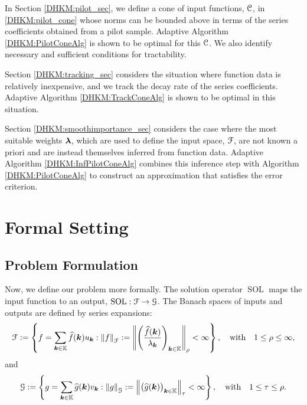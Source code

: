 \documentclass[USenglish]{article}
\theoremstyle{dgthm}
\theoremstyle{dgthm}
\theoremstyle{dgthm}
\theoremstyle{dgthm}
\theoremstyle{dgdef}
\theoremstyle{definition}
\DeclareMathOperator{\DHKMSOL}{SOL}
\newcommand{\DHKMhf}{\widehat{f}}
\newcommand{\DHKMhg}{\widehat{g}}
\newcommand{\DHKMnorm}[2][{}]{\ensuremath{\left \lVert #2 \right \rVert}_{#1}}
\begin{document}
In Section \ref{DHKM:pilot_sec}, we define a cone of input functions, ${\mathcal{C}}$, in \eqref{DHKM:pilot_cone} whose norms can be bounded above in terms of the series coefficients obtained from a pilot sample.  Adaptive Algorithm \ref{DHKM:PilotConeAlg} is shown to be optimal for this ${\mathcal{C}}$.  We also identify necessary and sufficient conditions for tractability.

Section \ref{DHKM:tracking_sec} considers the situation where function data is relatively inexpensive, and we track the decay rate of the series coefficients.  Adaptive Algorithm \ref{DHKM:TrackConeAlg} is shown to be optimal in this situation.

Section \ref{DHKM:smoothimportance_sec} considers the case where the most suitable weights ${\boldsymbol{\lambda}}$, which are used to define the input space, ${\mathcal{F}}$, are not known a priori and are instead themselves inferred from function data.  Adaptive Algorithm \ref{DHKM:InfPilotConeAlg} combines this inference step with Algorithm \ref{DHKM:PilotConeAlg} to construct an approximation that satisfies the error criterion.





\section{Formal Setting}\label{DHKM:secprobdef}




\subsection{Problem Formulation}

Now, we define our problem more formally.  The solution operator $\DHKMSOL$ maps the input function to an output, $\DHKMSOL:\calF \to \calG$.  The Banach spaces of inputs and outputs are defined by series expansions:
\begin{gather*}
    \calF := \left \{f = \sum_{\bsk \in \mathbb{K}} \DHKMhf(\bsk) u_{\bsk} : \DHKMnorm[\calF]{f} : = \DHKMnorm[\rho]{\left( \frac{\DHKMhf(\bsk)}{\lambda_{\bsk}} \right)_{\bsk \in \mathbb{K}}} < \infty \right\}, \quad\mbox{with}\quad 1 \le \rho \le \infty, 
\end{gather*}
and
\begin{gather*}
    \calG := \left \{g = \sum_{\bsk \in \mathbb{K}} \DHKMhg(\bsk) v_{\bsk} : \DHKMnorm[\calG]{g} : = \DHKMnorm[\tau]{\bigl(  \DHKMhg(\bsk)  \bigr)_{\bsk \in \mathbb{K}}} < \infty \right\}, \quad\mbox{with}\quad 1 \le \tau \le \rho.
\end{gather*}
\end{document}
